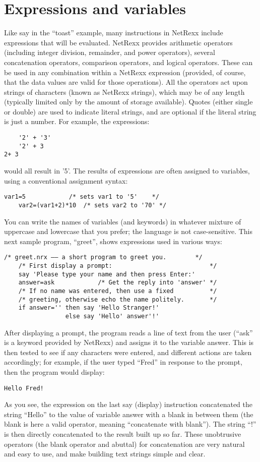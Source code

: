 \section{Expressions and variables}
Like say in the “toast” example, many instructions in NetRexx include expressions that will be evaluated. NetRexx provides arithmetic operators (including integer division, remainder, and power operators), several concatenation operators, comparison operators, and logical operators. These can be used in any combination within a NetRexx expression (provided, of course, that the data values are valid for those operations).
All the operators act upon strings of characters (known as NetRexx
strings), which may be of any length (typically limited only by the
amount of storage available). Quotes (either single or double) are
used to indicate literal strings, and are optional if the literal
string is just a number. For example, the expressions:
\begin{verbatim}
    '2' + '3'
    '2' + 3
2+ 3
\end{verbatim}
would all result in '5'.
The results of expressions are often assigned to variables, using a
conventional assignment syntax:
\begin{lstlisting}[label=assignment,caption=Assignment]
    var1=5            /* sets var1 to '5'    */
    var2=(var1+2)*10  /* sets var2 to '70' */
\end{lstlisting}
You can write the names of variables (and keywords) in whatever mixture of uppercase and lowercase that you prefer; the language is not case-sensitive.
This next sample program, “greet”, shows expressions used in various
ways:
\begin{lstlisting}[label=greet,caption=Greet]
    /* greet.nrx –– a short program to greet you.        */
    /* First display a prompt:                           */
    say 'Please type your name and then press Enter:'
    answer=ask            /* Get the reply into 'answer' */
    /* If no name was entered, then use a fixed          */
    /* greeting, otherwise echo the name politely.       */
    if answer='' then say 'Hello Stranger!'
                 else say 'Hello' answer'!'
\end{lstlisting}
After displaying a prompt, the program reads a line of text from the
user (“ask” is a keyword provided by NetRexx) and assigns it to the
variable answer. This is then tested to see if any characters were
entered, and different actions are taken accordingly; for example, if
the user typed “Fred” in response to the prompt, then the program
would display:
\begin{verbatim}
Hello Fred!
\end{verbatim}
As you see, the expression on the last say (display) instruction
concatenated the string “Hello” to the value of variable answer with a
blank in between them (the blank is here a valid operator, meaning
“concatenate with blank”). The string “!” is then directly
concatenated to the result built up so far. These unobtrusive
operators (the blank operator and abuttal) for concatenation are very
natural and easy to use, and make building text strings simple and
clear.


